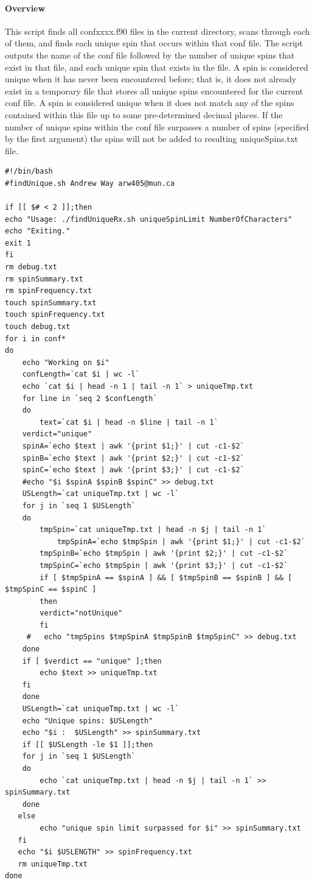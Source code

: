 \documentclass{article}
\begin{document}
\paragraph{Overview}
This script finds all confxxxx.f90 files in the current directory, scans through each of them,
and finds each unique spin that occurs within that conf file. The script outputs the name
of the conf file followed by the number of unique spins that exist in that file,
and each unique spin that exists in the file. A spin is considered unique when it has never 
been encountered before; that is, it does not already exist in a temporary file that stores all 
unique spins encountered for the current conf file. A spin is considered unique when it does not
match any of the spins contained within this file up to some pre-determined decimal places. 
If the number of unique spins within the conf file surpasses a number of spins
(specified by the first argument) the spins will not be added to resulting uniqueSpins.txt file. 
\lstset{language=BASH}
\begin{lstlisting}
#!/bin/bash
#findUnique.sh Andrew Way arw405@mun.ca

if [[ $# < 2 ]];then
echo "Usage: ./findUniqueRx.sh uniqueSpinLimit NumberOfCharacters"
echo "Exiting."
exit 1
fi
rm debug.txt 
rm spinSummary.txt
rm spinFrequency.txt
touch spinSummary.txt
touch spinFrequency.txt
touch debug.txt
for i in conf*
do
    echo "Working on $i"
    confLength=`cat $i | wc -l`
    echo `cat $i | head -n 1 | tail -n 1` > uniqueTmp.txt
    for line in `seq 2 $confLength`
    do
        text=`cat $i | head -n $line | tail -n 1`
	verdict="unique"
	spinA=`echo $text | awk '{print $1;}' | cut -c1-$2`
	spinB=`echo $text | awk '{print $2;}' | cut -c1-$2`
	spinC=`echo $text | awk '{print $3;}' | cut -c1-$2`
	#echo "$i $spinA $spinB $spinC" >> debug.txt 
	USLength=`cat uniqueTmp.txt | wc -l`
	for j in `seq 1 $USLength`
	do
	    tmpSpin=`cat uniqueTmp.txt | head -n $j | tail -n 1`
            tmpSpinA=`echo $tmpSpin | awk '{print $1;}' | cut -c1-$2`
	    tmpSpinB=`echo $tmpSpin | awk '{print $2;}' | cut -c1-$2`
	    tmpSpinC=`echo $tmpSpin | awk '{print $3;}' | cut -c1-$2`
	    if [ $tmpSpinA == $spinA ] && [ $tmpSpinB == $spinB ] && [ $tmpSpinC == $spinC ]
	    then
		verdict="notUnique"
	    fi
	 #   echo "tmpSpins $tmpSpinA $tmpSpinB $tmpSpinC" >> debug.txt
	done
	if [ $verdict == "unique" ];then
		echo $text >> uniqueTmp.txt
	fi
    done
    USLength=`cat uniqueTmp.txt | wc -l`
    echo "Unique spins: $USLength"
    echo "$i :  $USLength" >> spinSummary.txt
    if [[ $USLength -le $1 ]];then
	for j in `seq 1 $USLength`
	do
	    echo `cat uniqueTmp.txt | head -n $j | tail -n 1` >> spinSummary.txt
	done
   else
	    echo "unique spin limit surpassed for $i" >> spinSummary.txt
   fi
   echo "$i $USLENGTH" >> spinFrequency.txt
   rm uniqueTmp.txt
done
\end{lstlisting}
\end{document}
